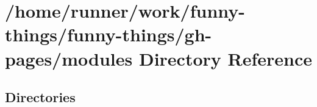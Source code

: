 \section{/home/runner/work/funny-\/things/funny-\/things/gh-\/pages/modules Directory Reference}
\label{dir_e05d7e2b1ecd646af5bb94391405f3b5}
\subsection*{Directories}
\begin{DoxyCompactItemize}
\end{DoxyCompactItemize}
